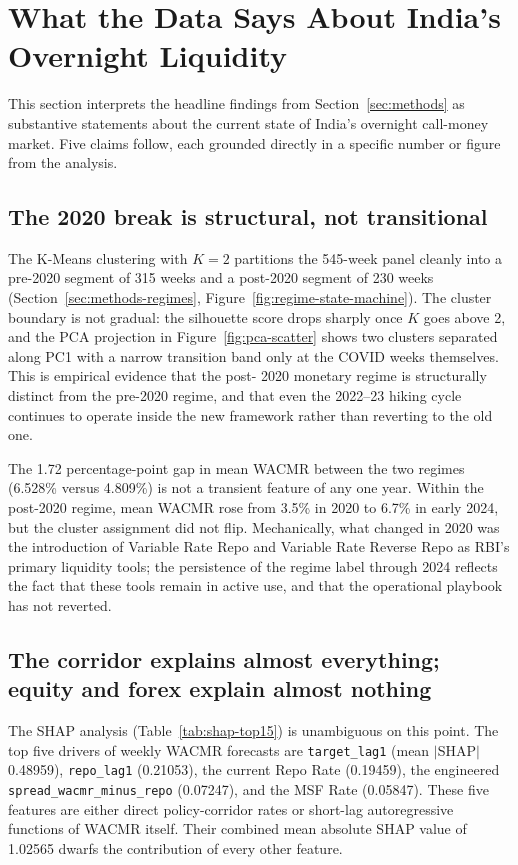 \section{What the Data Says About India's Overnight Liquidity}
\label{sec:results}

This section interprets the headline findings from
Section~\ref{sec:methods} as substantive statements about the current
state of India's overnight call-money market. Five claims follow,
each grounded directly in a specific number or figure from the
analysis.

\subsection{The 2020 break is structural, not transitional}

The K-Means clustering with $K=2$ partitions the 545-week panel
cleanly into a pre-2020 segment of 315 weeks and a post-2020 segment
of 230 weeks (Section~\ref{sec:methods-regimes},
Figure~\ref{fig:regime-state-machine}). The cluster boundary is not
gradual: the silhouette score drops sharply once $K$ goes above 2,
and the PCA projection in Figure~\ref{fig:pca-scatter} shows two
clusters separated along PC1 with a narrow transition band only at
the COVID weeks themselves. This is empirical evidence that the post-
2020 monetary regime is structurally distinct from the pre-2020
regime, and that even the 2022--23 hiking cycle continues to operate
inside the new framework rather than reverting to the old one.

The 1.72 percentage-point gap in mean WACMR between the two regimes
(6.528\% versus 4.809\%) is not a transient feature of any one year.
Within the post-2020 regime, mean WACMR rose from 3.5\% in 2020 to
6.7\% in early 2024, but the cluster assignment did not flip.
Mechanically, what changed in 2020 was the introduction of Variable
Rate Repo and Variable Rate Reverse Repo as RBI's primary liquidity
tools; the persistence of the regime label through 2024 reflects the
fact that these tools remain in active use, and that the operational
playbook has not reverted.

\subsection{The corridor explains almost everything; equity and forex
explain almost nothing}

The SHAP analysis (Table~\ref{tab:shap-top15}) is unambiguous on
this point. The top five drivers of weekly WACMR forecasts are
\texttt{target\_lag1} (mean $|$SHAP$|$ 0.48959), \texttt{repo\_lag1}
(0.21053), the current Repo Rate (0.19459), the engineered
\texttt{spread\_wacmr\_minus\_repo} (0.07247), and the MSF Rate
(0.05847). These five features are either direct policy-corridor rates
or short-lag autoregressive functions of WACMR itself. Their combined
mean absolute SHAP value of 1.02565 dwarfs the contribution of every
other feature.

